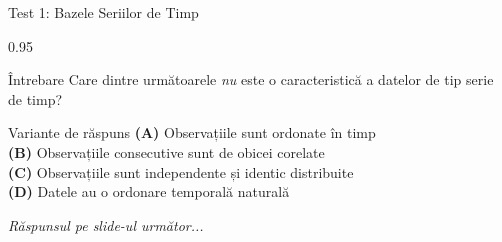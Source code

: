 \documentclass[9pt, aspectratio=169, t]{beamer}
\begin{document}
\begin{frame}{Test 1: Bazele Seriilor de Timp}
    \begin{cminipage}{0.95\textwidth}
    \begin{alertblock}{Întrebare}
        Care dintre următoarele \emph{nu} este o caracteristică a datelor de tip serie de timp?
    \end{alertblock}

    \vspace{0.4cm}

    \begin{block}{Variante de răspuns}
    \textcolor{MainBlue}{\textbf{(A)}} Observațiile sunt ordonate în timp\\[3pt]
    \textcolor{MainBlue}{\textbf{(B)}} Observațiile consecutive sunt de obicei corelate\\[3pt]
    \textcolor{MainBlue}{\textbf{(C)}} Observațiile sunt independente și identic distribuite\\[3pt]
    \textcolor{MainBlue}{\textbf{(D)}} Datele au o ordonare temporală naturală
    \end{block}
    \vspace{0.5cm}

    \begin{center}
        \textit{Răspunsul pe slide-ul următor...}
    \end{center}
    \end{cminipage}
\end{frame}
\end{document}
